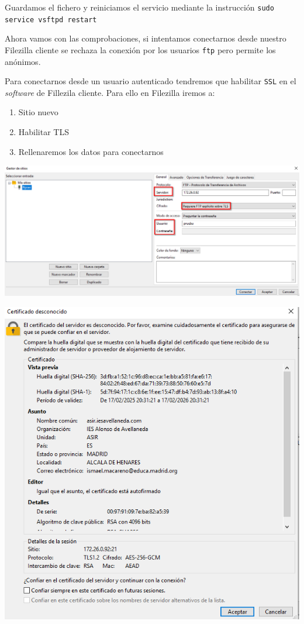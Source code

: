 \documentclass[11pt]{article}
\begin{document}
Guardamos el fichero y reiniciamos el servicio mediante la instrucción \texttt{sudo service vsftpd restart}

Ahora vamos con las comprobaciones, si intentamos conectarnos desde nuestro Filezilla cliente se rechaza la conexión por los usuarios \texttt{ftp} pero permite los anónimos.

Para conectarnos desde un usuario autenticado tendremos que habilitar \texttt{SSL} en el \emph{software} de Fillezila cliente. Para ello en Filezilla iremos a:
\begin{enumerate}
\item Sitio nuevo
\item Habilitar TLS
\item Rellenaremos los datos para conectarnos
\end{enumerate}

\begin{center}
\includegraphics[width=.9\linewidth]{./media/ftp-5.png}
\end{center}

\begin{center}
\includegraphics[width=.9\linewidth]{./media/ftp-6.png}
\end{center}
\end{document}
